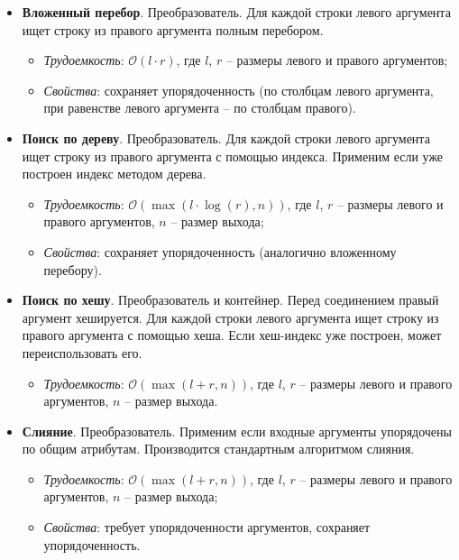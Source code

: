 \begin{itemize}
	\item \textbf{Вложенный перебор}. Преобразователь. Для каждой строки левого аргумента ищет
	      строку из правого аргумента полным перебором.
	      \begin{itemize}
		      \item \textit{Трудоемкость}: $\mathcal{O}(l \cdot r)$, где $l$, $r$
		            -- размеры левого и
		            правого аргументов;
		      \item \textit{Свойства}: сохраняет упорядоченность (по столбцам левого аргумента, при
		            равенстве левого аргумента -- по столбцам правого).
	      \end{itemize}
	\item \textbf{Поиск по дереву}. Преобразователь. Для каждой строки левого аргумента ищет
	      строку из правого аргумента с помощью индекса. Применим если уже построен индекс методом дерева.
	      \begin{itemize}
		      \item \textit{Трудоемкость}: $\mathcal{O}(\max(l \cdot \log(r), n))$, где $l$, $r$
		            --
		            размеры левого и правого аргументов, $n$ -- размер выхода;
		      \item \textit{Свойства}: сохраняет упорядоченность (аналогично вложенному перебору).
	      \end{itemize}
	\item \textbf{Поиск по хешу}. Преобразователь и контейнер. Перед соединением правый аргумент
	      хешируется. Для каждой строки левого аргумента ищет строку из правого аргумента с помощью хеша.
	      Если хеш-индекс уже построен, может переиспользовать его.
	      \begin{itemize}
		      \item \textit{Трудоемкость}: $\mathcal{O}(\max(l + r, n))$, где $l$, $r$
		            --
		            размеры левого и правого аргументов, $n$ -- размер выхода.
	      \end{itemize}
	\item \textbf{Слияние}. Преобразователь. Применим если входные аргументы упорядочены по общим
	      атрибутам. Производится стандартным алгоритмом слияния.
	      \begin{itemize}
		      \item \textit{Трудоемкость}: $\mathcal{O}(\max(l + r, n))$, где $l$, $r$
		            --
		            размеры левого и правого аргументов, $n$ -- размер выхода;
		      \item \textit{Свойства}: требует упорядоченности аргументов, сохраняет упорядоченность.
	      \end{itemize}
\end{itemize}
